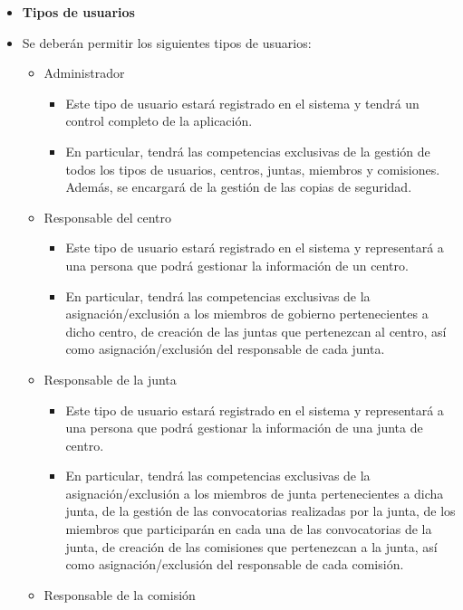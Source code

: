 \begin{itemize}
    \item \textbf{Tipos de usuarios}
    \item[] Se deberán permitir los siguientes tipos de usuarios: 
     \begin{itemize}
        \item Administrador
          \begin{itemize}
              \item Este tipo de usuario estará registrado en el sistema y tendrá un control completo de la aplicación. 
              \item En particular, tendrá las competencias exclusivas de la gestión de todos los tipos de usuarios, centros, juntas, miembros y comisiones. Además, se encargará de la gestión de las copias de seguridad.
          \end{itemize}
          \item Responsable del centro
           \begin{itemize}
               \item Este tipo de usuario estará registrado en el sistema y representará a una persona que podrá gestionar la información de un centro.
               \item En particular, tendrá las competencias exclusivas de la asignación/exclusión a los miembros de gobierno pertenecientes a dicho centro, de creación de las juntas que pertenezcan al centro, así como asignación/exclusión del responsable de cada junta.
            \end{itemize}
            \item Responsable de la junta
           \begin{itemize}
               \item Este tipo de usuario estará registrado en el sistema y representará a una persona que podrá gestionar la información de una junta de centro.
               \item En particular, tendrá las competencias exclusivas de la asignación/exclusión a los miembros de junta pertenecientes a dicha junta, de la gestión de las convocatorias realizadas por la junta, de los miembros que participarán en cada una de las convocatorias de la junta, de creación de las comisiones que pertenezcan a la junta, así como asignación/exclusión del responsable de cada comisión.
            \end{itemize}
          \item Responsable de la comisión 
           \begin{itemize}

\end{itemize}
\end{itemize}
\end{itemize}
